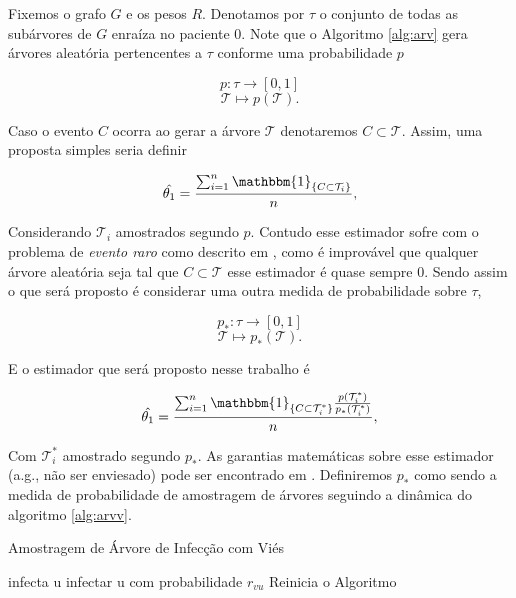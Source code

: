 \documentclass{article}
\begin{document}
Fixemos o grafo $G$ e os pesos $R$. Denotamos por $\tau$ o conjunto de todas as subárvores de $G$ enraíza no paciente 0. Note que o Algoritmo \ref{alg:arv} gera árvores aleatória pertencentes a $\tau$ conforme uma probabilidade $p$


\[p: \tau \to [0,1]\]
\[\mathcal{T} \mapsto p(\mathcal{T}).\]

Caso o evento $C$ ocorra ao gerar a árvore $\mathcal{T}$ denotaremos $C \subset \mathcal{T}$. Assim, uma proposta simples seria definir

\[\hat{\theta_1} = \frac{\sum_{i=1}^n \mathbbm{1}_{\{C \subset \mathcal{T}_i\}}}{n}, \]

Considerando $\mathcal{T}_i$ amostrados segundo $p$. Contudo esse estimador sofre com o problema de \textit{evento raro} como descrito em \cite{ImportSample}, como é improvável que qualquer árvore aleatória seja tal que $C \subset \mathcal{T}$ esse estimador é quase sempre 0. Sendo assim o que será proposto é considerar uma outra medida de probabilidade sobre $\tau$, 

\[p_*: \tau \to [0,1]\]
\[\mathcal{T} \mapsto p_*(\mathcal{T}).\]


E o estimador que será proposto nesse trabalho é

\[\hat{\theta_1} = \frac{\sum_{i=1}^n \mathbbm{1}_{\{C \subset \mathcal{T}^*_i\}} \frac{p(\mathcal{T}^*_i)}{p_*(\mathcal{T}^*_i)} }{n}, \]

Com $\mathcal{T}_i^*$ amostrado segundo $p_*$. As garantias matemáticas sobre esse estimador (a.g., não ser enviesado) pode ser encontrado em \cite{ImportSample}. Definiremos $p_*$ como sendo a medida de probabilidade de amostragem de árvores seguindo a dinâmica do algoritmo \ref{alg:arvv}.

\begin{algorithm}
\caption{Amostragem de Árvore de Infecção com Viés} \label{alg:arvv}
\begin{algorithmic}
                    \State infecta u
                \EndIf
            \Else
                    \State infectar u com probabilidade $r_{vu}$
                \EndIf
            \EndIf
        \EndFor
    \EndFor
        \State Reinicia o Algoritmo
    \EndIf
\EndFor
\end{algorithmic}
\end{algorithm}
\end{document}
